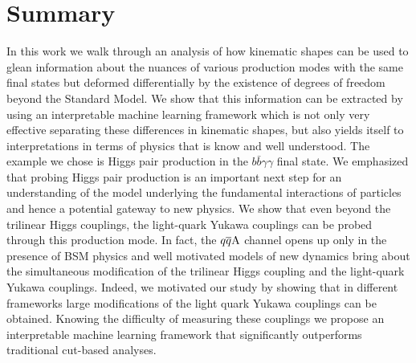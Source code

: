 

\section{Summary}
\label{sec:Sum}
In this work we walk through an analysis of how kinematic shapes can be used to glean information about the nuances of various production modes with the same final states but deformed differentially by the existence of degrees of freedom beyond the Standard Model. We show that this information can be extracted by using an interpretable machine learning framework which is not only very effective separating these differences in kinematic shapes, but also yields itself to interpretations in terms of physics that is know and well understood. The example we chose is Higgs pair production in the $b\bar{b}\gamma \gamma$ final state.
We emphasized that probing Higgs pair production is an important next step for an understanding of the model underlying the fundamental interactions of particles and hence a potential gateway to new physics. We show that even beyond the trilinear Higgs couplings, the light-quark Yukawa couplings can be probed through this production mode. In fact, the $q\overline q \rm A$ channel opens up only in the presence of BSM physics and well motivated models of new dynamics bring about the simultaneous modification of the trilinear Higgs coupling and the light-quark Yukawa couplings. Indeed, we motivated our study by showing that in different frameworks large modifications of the light quark Yukawa couplings can be obtained. Knowing the difficulty of measuring these couplings we propose an interpretable machine learning framework that significantly outperforms traditional cut-based analyses.

